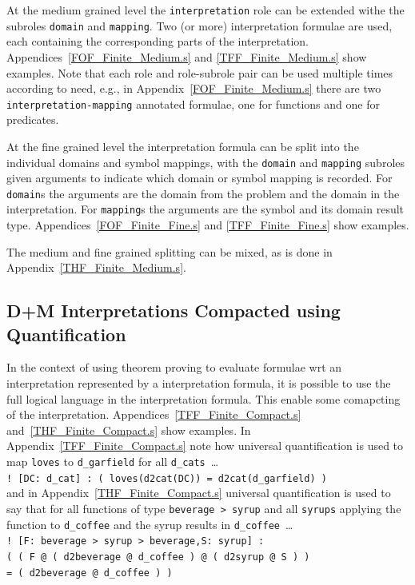 \documentclass{easychair}
\newcommand{\smalltt}[1]{\small \texttt{#1}}
\begin{document}
At the medium grained level the {\tt interpretation} role can be extended withe the subroles
{\tt domain} and {\tt mapping}.
Two (or more) interpretation formulae are used, each containing the corresponding parts of the 
interpretation.
Appendices~\ref{FOF_Finite_Medium.s} and \ref{TFF_Finite_Medium.s} show examples.
Note that each role and role-subrole pair can be used multiple times according to need, e.g.,
in Appendix~\ref{FOF_Finite_Medium.s} there are two {\tt interpretation-mapping} annotated
formulae, one for functions and one for predicates.

At the fine grained level the interpretation formula can be split into the individual domains
and symbol mappings, with the {\tt domain} and {\tt mapping} subroles given arguments to indicate
which domain or symbol mapping is recorded.
For {\tt domain}s the arguments are the domain from the problem and the domain in the 
interpretation.
For {\tt mapping}s the arguments are the symbol and its domain result type.
Appendices~\ref{FOF_Finite_Fine.s} and \ref{TFF_Finite_Fine.s} show examples.

The medium and fine grained splitting can be mixed, as is done in 
Appendix~\ref{THF_Finite_Medium.s}.

\subsection{{\sf D+M} Interpretations Compacted using Quantification}
\label{NewTarskianCompact}

In the context of using theorem proving to evaluate formulae wrt an interpretation represented
by a interpretation formula, it is possible to use the full logical language in the interpretation 
formula.
This enable some comapcting of the interpretation.
Appendices~\ref{TFF_Finite_Compact.s} and~\ref{THF_Finite_Compact.s} show examples.
In Appendix~\ref{TFF_Finite_Compact.s} note how universal quantification is used to map
{\tt loves} to {\tt d\_garfield} for all {\tt d\_cats}~\ldots \\
\hspace*{0.5cm}\smalltt{! [DC: d\_cat] : ( loves(d2cat(DC)) = d2cat(d\_garfield) )} \\
and in Appendix~\ref{THF_Finite_Compact.s} universal quantification is used to say that for all
functions of type {\tt beverage > syrup} and all {\tt syrups} applying the function to
{\tt d\_coffee} and the syrup results in {\tt d\_coffee}~\ldots \\
\hspace*{0.5cm}\smalltt{! [F: beverage > syrup > beverage,S: syrup] :} \\
\hspace*{1.0cm}\smalltt{( ( F @ ( d2beverage @ d\_coffee ) @ ( d2syrup @ S ) )} \\
\hspace*{1.0cm}\smalltt{= ( d2beverage @ d\_coffee ) )}
\end{document}
